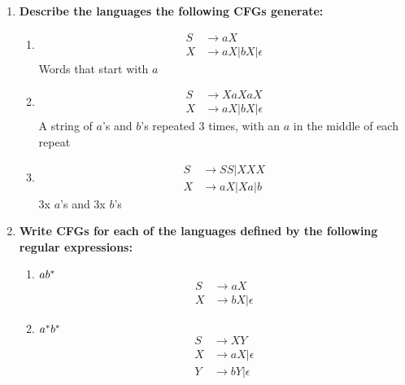 

\begin{enumerate}

\item \textbf{Describe the languages the following CFGs generate:}

\begin{enumerate}
  \item
    \begin{equation*}
      \begin{aligned}
        S &\rightarrow aX \\
        X &\rightarrow aX | bX | \epsilon
      \end{aligned}
    \end{equation*}
    Words that start with $a$
  \item
    \begin{equation*}
      \begin{aligned}
        S &\rightarrow XaXaX \\
        X &\rightarrow aX | bX | \epsilon
      \end{aligned}
    \end{equation*}
    A string of $a$'s and $b$'s repeated 3 times, with 
    an $a$ in the middle of each repeat
  \item
    \begin{equation*}
      \begin{aligned}
        S &\rightarrow SS | XXX \\
        X &\rightarrow aX | Xa | b
      \end{aligned}
    \end{equation*}
    3x $a$'s and 3x $b$'s
\end{enumerate}

\newpage
\item \textbf{Write CFGs for each of the languages defined by the following regular expressions:}
\begin{enumerate}
  \item $ab{}^\ast$
    \begin{equation*}
      \begin{aligned}
        S &\rightarrow aX \\
        X &\rightarrow bX | \epsilon
      \end{aligned}
    \end{equation*}

  \item $a{}^\ast b{}^\ast$
    \begin{equation*}
      \begin{aligned}
        S &\rightarrow XY \\
        X &\rightarrow aX | \epsilon \\
        Y &\rightarrow bY | \epsilon
      \end{aligned}
    \end{equation*}
    

\end{enumerate}
\end{enumerate}
